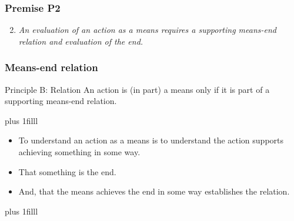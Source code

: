 \documentclass[noamssymb,
graphics,
]{beamer} %
\newcommand{\hozlinedash}[0]{
  \noindent\hdashrule[0.5ex][c]{\textwidth}{.1pt}{2.5pt}
}
\newcommand{\btVFill}{\vskip0pt plus 1filll}
\begin{document}
\begin{frame}
  \frametitle{Premise P2}
  {%
    \begin{enumerate}
      \setcounter{enumi}{1}
    \item \emph{An evaluation of an action as a means requires a supporting means-end relation and evaluation of the end.}
    \end{enumerate}
  }
  \hozlinedash
\end{frame}

\begin{frame}
  \frametitle{Means-end relation}

  \begin{block}{Principle B: Relation}
    An action is (in part) a means only if it is part of a supporting means-end relation.
  \end{block}
  \btVFill
  \vspace{-10pt}

  \begin{itemize}
  \item To understand an action as a means is to understand the action supports achieving something in some way.
  \item That something is the end.
  \item And, that the means achieves the end in some way establishes the relation.
  \end{itemize}
\btVFill
\end{frame}
\end{document}
